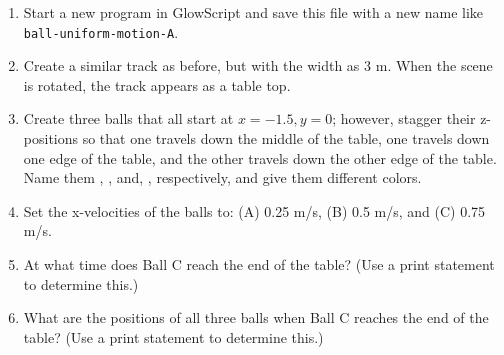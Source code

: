 \begin{description}
\begin{enumerate}
	\item Start a new program in GlowScript and save this file with a new name like \texttt{ball-uniform-motion-A}.
	\item Create a similar track as before, but with the width as 3 m. When the scene is rotated, the track appears as a table top.
	\item Create three balls that all start at $x=-1.5, y=0$; however, stagger their z-positions so that one travels down the middle of the table, one travels down one edge of the table, and the other travels down the other edge of the table. Name them , , and, , respectively, and give them different colors.
	\item Set the x-velocities of the balls to: (A) 0.25 m/s, (B) 0.5 m/s, and (C) 0.75 m/s.
	\item At what time does Ball C reach the end of the table? (Use a print statement to determine this.)
	\item What are the positions of all three balls when Ball C reaches the end of the table? (Use a print statement to determine this.)
\end{enumerate}

\end{description}

